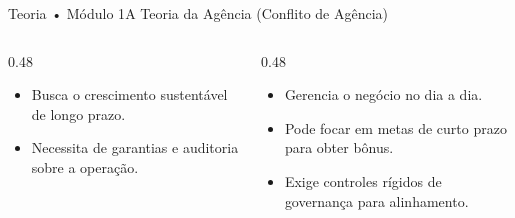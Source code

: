 \begin{senaiframe}{Teoria • Módulo 1}{A Teoria da Agência (Conflito de Agência)}
  \begin{columns}[t]
    \begin{column}{0.48\textwidth}
      \begin{tcolorbox}[senaibluecard, title={O Principal (Acionista)}]
        \begin{itemize}
          \item Busca o crescimento sustentável de longo prazo.
          \item Necessita de garantias e auditoria sobre a operação.
        \end{itemize}
      \end{tcolorbox}
    \end{column}
    \begin{column}{0.48\textwidth}
      \begin{tcolorbox}[senairedcard, title={O Agente (Executivo contratado)}]
        \begin{itemize}
          \item Gerencia o negócio no dia a dia.
          \item Pode focar em metas de curto prazo para obter bônus.
          \item Exige controles rígidos de governança para alinhamento.
        \end{itemize}
      \end{tcolorbox}
    \end{column}
  \end{columns}
\end{senaiframe}

